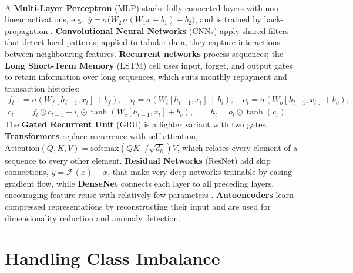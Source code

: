 \documentclass[12pt,a4paper,final]{extreport}
\begin{document}
\paragraph{} A \textbf{Multi-Layer Perceptron} (MLP) stacks fully connected layers with non-linear activations, e.g.\ $\hat{y}=\sigma\big(W_2\,\sigma(W_1x+b_1)+b_2\big)$, and is trained by back-propagation \cite{p3}. \textbf{Convolutional Neural Networks} (CNNs) apply shared filters that detect local patterns; applied to tabular data, they capture interactions between neighbouring features. \textbf{Recurrent networks} process sequences; the \textbf{Long Short-Term Memory} (LSTM) cell \cite{hochreiter1997} uses input, forget, and output gates to retain information over long sequences, which suits monthly repayment and transaction histories:
\begin{align}
f_t &= \sigma(W_f[h_{t-1},x_t]+b_f), \quad i_t=\sigma(W_i[h_{t-1},x_t]+b_i), \quad o_t=\sigma(W_o[h_{t-1},x_t]+b_o),\\
c_t &= f_t\odot c_{t-1}+i_t\odot\tanh(W_c[h_{t-1},x_t]+b_c), \qquad h_t=o_t\odot\tanh(c_t).
\end{align}
The \textbf{Gated Recurrent Unit} (GRU) is a lighter variant with two gates. \textbf{Transformers} replace recurrence with self-attention, $\mathrm{Attention}(Q,K,V)=\mathrm{softmax}(QK^{\top}/\sqrt{d_k})V$, which relates every element of a sequence to every other element. \textbf{Residual Networks} (ResNet) add skip connections, $y=\mathcal{F}(x)+x$, that make very deep networks trainable by easing gradient flow, while \textbf{DenseNet} connects each layer to all preceding layers, encouraging feature reuse with relatively few parameters \cite{p2}. \textbf{Autoencoders} learn compressed representations by reconstructing their input and are used for dimensionality reduction and anomaly detection.

\section{Handling Class Imbalance}
\end{document}
